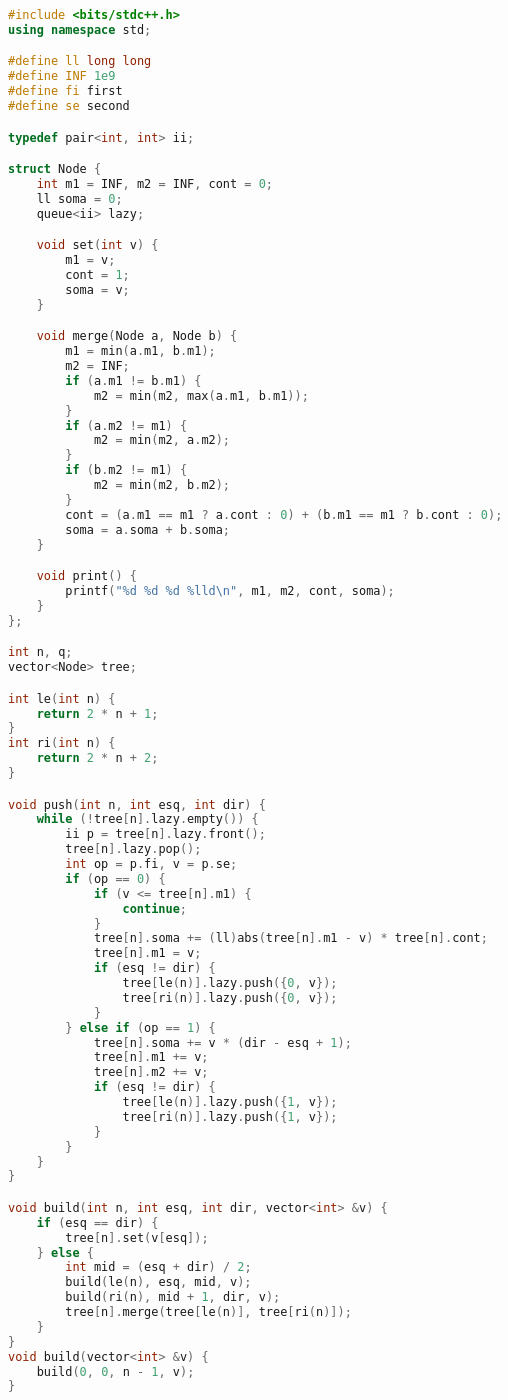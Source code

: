 \documentclass[11pt, a4paper, oneside]{book}
\begin{document}
\begin{multicols}{2}
\begin{lstlisting}[language=C++]
#include <bits/stdc++.h>
using namespace std;

#define ll long long
#define INF 1e9
#define fi first
#define se second

typedef pair<int, int> ii;

struct Node {
    int m1 = INF, m2 = INF, cont = 0;
    ll soma = 0;
    queue<ii> lazy;

    void set(int v) {
        m1 = v;
        cont = 1;
        soma = v;
    }

    void merge(Node a, Node b) {
        m1 = min(a.m1, b.m1);
        m2 = INF;
        if (a.m1 != b.m1) {
            m2 = min(m2, max(a.m1, b.m1));
        }
        if (a.m2 != m1) {
            m2 = min(m2, a.m2);
        }
        if (b.m2 != m1) {
            m2 = min(m2, b.m2);
        }
        cont = (a.m1 == m1 ? a.cont : 0) + (b.m1 == m1 ? b.cont : 0);
        soma = a.soma + b.soma;
    }

    void print() {
        printf("%d %d %d %lld\n", m1, m2, cont, soma);
    }
};

int n, q;
vector<Node> tree;

int le(int n) {
    return 2 * n + 1;
}
int ri(int n) {
    return 2 * n + 2;
}

void push(int n, int esq, int dir) {
    while (!tree[n].lazy.empty()) {
        ii p = tree[n].lazy.front();
        tree[n].lazy.pop();
        int op = p.fi, v = p.se;
        if (op == 0) {
            if (v <= tree[n].m1) {
                continue;
            }
            tree[n].soma += (ll)abs(tree[n].m1 - v) * tree[n].cont;
            tree[n].m1 = v;
            if (esq != dir) {
                tree[le(n)].lazy.push({0, v});
                tree[ri(n)].lazy.push({0, v});
            }
        } else if (op == 1) {
            tree[n].soma += v * (dir - esq + 1);
            tree[n].m1 += v;
            tree[n].m2 += v;
            if (esq != dir) {
                tree[le(n)].lazy.push({1, v});
                tree[ri(n)].lazy.push({1, v});
            }
        }
    }
}

void build(int n, int esq, int dir, vector<int> &v) {
    if (esq == dir) {
        tree[n].set(v[esq]);
    } else {
        int mid = (esq + dir) / 2;
        build(le(n), esq, mid, v);
        build(ri(n), mid + 1, dir, v);
        tree[n].merge(tree[le(n)], tree[ri(n)]);
    }
}
void build(vector<int> &v) {
    build(0, 0, n - 1, v);
}


\end{lstlisting}
\end{multicols}
\end{document}
